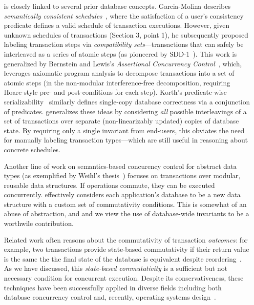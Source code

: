 \iconfluence is closely linked to several prior database
concepts. Garcia-Molina describes \textit{semantically consistent
  schedules}~\cite{garciamolina-semantics}, where the satisfaction of
a user's consistency predicate defines a valid schedule of transaction
executions. However, given unknown schedules of transactions (Section
3, point 1), he subsequently proposed labeling transaction steps via
\textit{compatibility sets}---transactions that can safely be
interleaved as a series of atomic steps (as pioneered by
SDD-1~\cite{sdd1}). This work is generalized by Bernstein and Lewis's
\textit{Assertional Concurrency Control}~\cite{decomp-semantics},
which, leverages axiomatic program analysis to decompose transactions
into a set of atomic steps (in the non-modular interference-free
decomposition, requiring Hoare-style pre- and post-conditions for each
step). Korth's predicate-wise
serializability~\cite{korth-serializability} similarly defines
single-copy database correctness via a conjunction of
predicates. \iconfluence generalizes these ideas by considering
\textit{all} possible interleavings of a set of transactions over
separate (non-linearizably updated) copies of database state. By
requiring only a single invariant from end-users, this obviates the
need for manually labeling transaction types---which are still useful
in reasoning about concrete schedules.

Another line of work on semantics-based concurency control for
abstract data types (as exemplified by Weihl's
thesis~\cite{weihl-thesis}) focuses on transactions over modular,
reusable data structures. If operations commute, they can be executed
concurrently. \iconfluence effectively considers each application's
database to be a new data structure with a custom set of commutativity
conditions. This is somewhat of an abuse of abstraction, and and we
view the use of database-wide invariants to be a worthwile
contribution.

 Related work often reasons about
the commutativity of transaction \textit{outcomes}: for example, two
transactions provide state-based commutativity if their return value
is the same the the final state of the database is equivalent despite
reordering~\cite{kohler-commutativity,weihl-thesis}. As we have
discussed, this \textit{state-based commutativity} is a sufficient but
not necessary condition for concurrent execution. Despite its
conservativeness, these techniques have been successfully applied in
diverse fields including both database concurrency control and,
recently, operating systems design~\cite{kohler-commutativity}.

